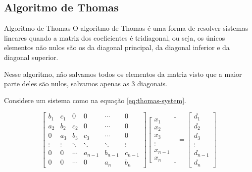 \documentclass[11pt]{beamer}
\begin{document}
\subsection{Algoritmo de Thomas}

\begin{frame}{Algoritmo de Thomas}
    O algoritmo de Thomas é uma forma de resolver sistemas lineares quando a matriz dos coeficientes é tridiagonal, ou seja, os únicos elementos não nulos são os da diagonal principal, da diagonal inferior e da diagonal superior.

    \vspace{0.2cm}

    Nesse algoritmo, não salvamos todos os elementos da matriz visto que a maior parte deles são nulos, salvamos apenas as 3 diagonais.

    \vspace{0.2cm}

    Considere um sistema como na equação \ref{eq:thomas-system}.

    \begin{equation}
        \begin{bmatrix} 
        b_1 & c_1 & 0 & 0 & \cdots & 0 \\ 
        a_2 & b_2 & c_2 & 0 & \cdots & 0 \\ 
        0 & a_3 & b_3 & c_3 & \cdots & 0 \\ 
        \vdots & \vdots & \ddots & \ddots & \ddots & \vdots \\ 
        0 & 0 & \cdots & a_{n-1} & b_{n-1} & c_{n-1} \\ 
        0 & 0 & \cdots & 0 & a_n & b_n 
        \end{bmatrix} 
        \begin{bmatrix} 
        x_1 \\ 
        x_2 \\ 
        x_3 \\ 
        \vdots \\ 
        x_{n-1} \\ 
        x_n 
        \end{bmatrix} 
        = 
        \begin{bmatrix} 
        d_1 \\ 
        d_2 \\ 
        d_3 \\ 
        \vdots \\ 
        d_{n-1} \\ 
        d_n 
        \end{bmatrix}
        \label{eq:thomas-system}
    \end{equation}

\end{frame}
\end{document}
